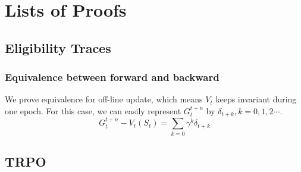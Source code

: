 \documentclass[11pt,a4paper]{article}
\begin{document}
\clearpage




\appendix
\section{Lists of Proofs}
\subsection{Eligibility Traces}
\subsubsection{Equivalence between forward and backward}
We prove equivalence for off-line update, which means $V_t$ keeps invariant during one epoch. For this case, we can easily represent $G_{t}^{t+n}$ by $\delta_{t+k}, k=0,1,2\cdots$.
\begin{equation}
    G_{t}^{t+n} - V_t(S_t) = \sum_{k=0}\gamma^k \delta_{t+k}
\end{equation} 




\subsection{TRPO}
\end{document}
